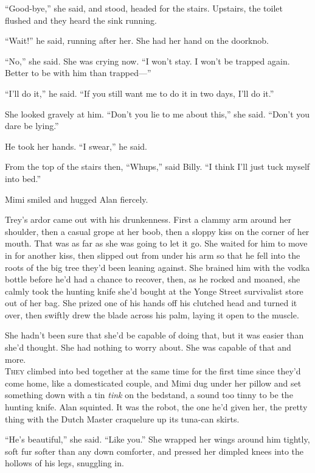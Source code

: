 ``Good-bye,'' she said, and stood, headed for the stairs.  Upstairs,
the toilet flushed and they heard the sink running.

``Wait!'' he said, running after her.  She had her hand on the
doorknob.

``No,'' she said.  She was crying now.  ``I won't stay.  I won't be
trapped again.  Better to be with him than trapped---''

``I'll do it,'' he said.  ``If you still want me to do it in two days,
I'll do it.''

She looked gravely at him.  ``Don't you lie to me about this,'' she
said.  ``Don't you dare be lying.''

He took her hands.  ``I swear,'' he said.

From the top of the stairs then, ``Whups,'' said Billy.  ``I think
I'll just tuck myself into bed.''

Mimi smiled and hugged Alan fiercely.

Trey's ardor came out with his drunkenness.  First a clammy arm around
her shoulder, then a casual grope at her boob, then a sloppy kiss on
the corner of her mouth.  That was as far as she was going to let it
go.  She waited for him to move in for another kiss, then slipped out
from under his arm so that he fell into the roots of the big tree
they'd been leaning against.  She brained him with the vodka bottle
before he'd had a chance to recover, then, as he rocked and moaned,
she calmly took the hunting knife she'd bought at the Yonge Street
survivalist store out of her bag.  She prized one of his hands off his
clutched head and turned it over, then swiftly drew the blade across
his palm, laying it open to the muscle.

She hadn't been sure that she'd be capable of doing that, but it was
easier than she'd thought.  She had nothing to worry about.  She was
capable of that and more.
\\
\lettrine[lines=3, lhang=.5, nindent=0pt, findent=2pt]{T}{hey} climbed into bed together at the same time for the first time
since they'd come home, like a domesticated couple, and Mimi dug under
her pillow and set something down with a tin \textit{tink} on the
bedstand, a sound too tinny to be the hunting knife.  Alan squinted. 
It was the robot, the one he'd given her, the pretty thing with the
Dutch Master craquelure up its tuna-can skirts.

``He's beautiful,'' she said.  ``Like you.'' She wrapped her wings
around him tightly, soft fur softer than any down comforter, and
pressed her dimpled knees into the hollows of his legs, snuggling in.

